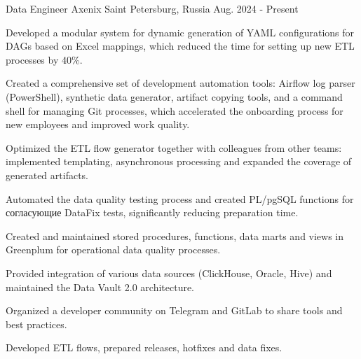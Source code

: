 

\begin{cventries}

  \cventry
    {Data Engineer} %
    {Axenix} %
    {Saint Petersburg, Russia} %
    {Aug. 2024 - Present} %
    {
      \begin{cvitems} %
        \item {Developed a modular system for dynamic generation of YAML configurations for DAGs based on Excel mappings, which reduced the time for setting up new ETL processes by 40\%.}
        \item {Created a comprehensive set of development automation tools: Airflow log parser (PowerShell), synthetic data generator, artifact copying tools, and a command shell for managing Git processes, which accelerated the onboarding process for new employees and improved work quality.}
        \item {Optimized the ETL flow generator together with colleagues from other teams: implemented templating, asynchronous processing and expanded the coverage of generated artifacts.}
        \item {Automated the data quality testing process and created PL/pgSQL functions for согласующие DataFix tests, significantly reducing preparation time.}
        \item {Created and maintained stored procedures, functions, data marts and views in Greenplum for operational data quality processes.}
        \item {Provided integration of various data sources (ClickHouse, Oracle, Hive) and maintained the Data Vault 2.0 architecture.}
        \item {Organized a developer community on Telegram and GitLab to share tools and best practices.}
        \item {Developed ETL flows, prepared releases, hotfixes and data fixes.}
      \end{cvitems}
    }


\end{cventries}
